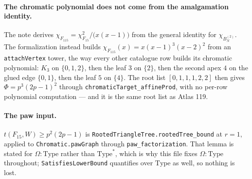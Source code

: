 \documentclass[11pt]{article}
\begin{document}
\paragraph{The chromatic polynomial does not come from the amalgamation
identity.}
The note derives
$\chi_{F_{115}}=\chi_{F_{15}}^2/\bigl(x(x-1)\bigr)$ from the general identity
for $\chi_{B_N^{(2)}}$.  The formalization instead builds
$\chi_{F_{115}}(x)=x(x-1)^3(x-2)^2$ from an \texttt{attachVertex} tower, the way
every other catalogue row builds its chromatic polynomial: $K_3$ on $\{0,1,2\}$,
then the leaf $3$ on $\{2\}$, then the second apex $4$ on the glued edge
$\{0,1\}$, then the leaf $5$ on $\{4\}$.  The root list $[0,1,1,1,2,2]$ then
gives $\Phi=p^3(2p-1)^2$ through \texttt{chromaticTarget\_affineProd}, with no
per-row polynomial computation --- and it is the same root list as Atlas 119.

\paragraph{The paw input.}
$t(F_{15},W)\geq p^2(2p-1)$ is
\texttt{RootedTriangleTree.rootedTree\_bound} at $r=1$, applied to
\texttt{Chromatic.pawGraph} through \texttt{paw\_factorization}.  That lemma is
stated for $\Omega:\mathrm{Type}$ rather than $\mathrm{Type}^*$, which is why
this file fixes $\Omega:\mathrm{Type}$ throughout; \texttt{SatisfiesLowerBound}
quantifies over $\mathrm{Type}$ as well, so nothing is lost.
\end{document}
